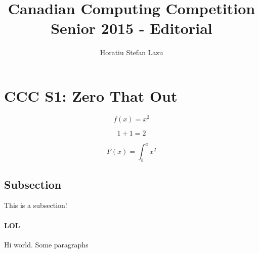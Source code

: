 \documentclass[52pt]{report}
\title{Canadian Computing Competition Senior 2015 - Editorial}
\author{Horatiu Stefan Lazu}
\begin{document}
	\maketitle
	\newpage
	
	
	\section{CCC S1: Zero That Out}
	\begin{equation*}  %
		f(x) = x^2
	\end{equation*}
	
	\begin{equation*}
		1+1=2
	\end{equation*}
	
	\begin{equation*}
		F(x) = \int^a_b x^2
	\end{equation*}
	
	\subsection{Subsection} %
	This is a subsection!
	
	\paragraph{LOL}
	Hi world. Some paragraphs
\end{document}
